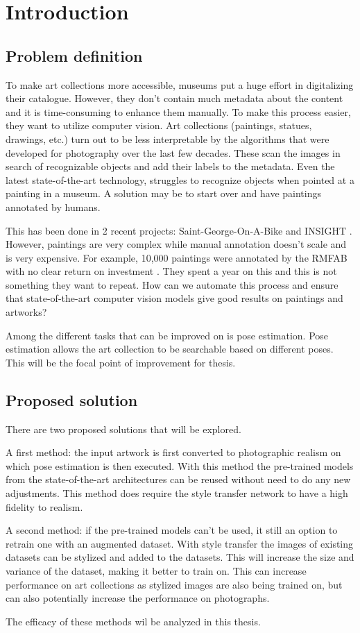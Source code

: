 \chapter{Introduction}
\label{chap:intro}

\section{Problem definition}

To make art collections more accessible, museums put a huge effort in digitalizing their catalogue.
However, they don't contain much metadata about the content and it is time-consuming to enhance them manually.
To make this process easier, they want to utilize computer vision.
Art collections (paintings, statues, drawings, etc.) turn out to be less interpretable by the algorithms that were developed for photography over the last few decades. 
These scan the images in search of recognizable objects and add their labels to the metadata.
Even the latest state-of-the-art technology, struggles to recognize objects when pointed at a painting in a museum.  
A solution may be to start over and have paintings annotated by humans.  
  
This has been done in 2 recent projects: Saint-George-On-A-Bike \cite{GeorgeOnABike} and INSIGHT \cite{Insight}.
However, paintings are very complex while manual annotation doesn't scale and is very expensive.
For example, 10,000 paintings were annotated by the \gls{RMFAB} with no clear return on investment \cite{RMFAB2024}.
They spent a year on this and this is not something they want to repeat.
How can we automate this process and ensure that state-of-the-art computer vision models give good results on paintings and artworks?  

Among the different tasks that can be improved on is pose estimation.
Pose estimation allows the art collection to be searchable based on different poses.
This will be the focal point of improvement for thesis.

\section{Proposed solution}

There are two proposed solutions that will be explored.

A first method: the input artwork is first converted to photographic realism on which pose estimation is then executed.
With this method the pre-trained models from the state-of-the-art architectures can be reused without need to do any new adjustments.
This method does require the style transfer network to have a high fidelity to realism.

A second method: if the pre-trained models can't be used, it still an option to retrain one with an augmented dataset.
With style transfer the images of existing datasets can be stylized and added to the datasets.
This will increase the size and variance of the dataset, making it better to train on.
This can increase performance on art collections as stylized images are also being trained on, but can also potentially increase the performance on photographs.

The efficacy of these methods wil be analyzed in this thesis.